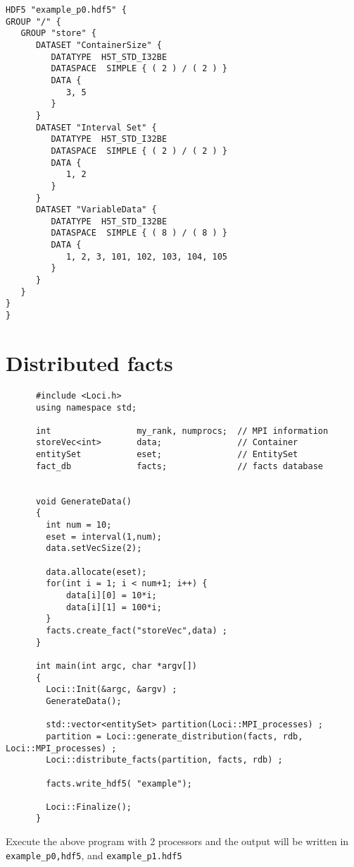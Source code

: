 \begin{verbatim}
HDF5 "example_p0.hdf5" {
GROUP "/" {
   GROUP "store" {
      DATASET "ContainerSize" {
         DATATYPE  H5T_STD_I32BE  
         DATASPACE  SIMPLE { ( 2 ) / ( 2 ) } 
         DATA {
            3, 5
         } 
      } 
      DATASET "Interval Set" {
         DATATYPE  H5T_STD_I32BE  
         DATASPACE  SIMPLE { ( 2 ) / ( 2 ) } 
         DATA {
            1, 2
         } 
      } 
      DATASET "VariableData" {
         DATATYPE  H5T_STD_I32BE  
         DATASPACE  SIMPLE { ( 8 ) / ( 8 ) } 
         DATA {
            1, 2, 3, 101, 102, 103, 104, 105
         } 
      } 
   } 
} 
} 
\end{verbatim}
\section {Distributed facts }
\begin{verbatim} 
      #include <Loci.h>
      using namespace std;
    
      int                 my_rank, numprocs;  // MPI information
      storeVec<int>       data;               // Container
      entitySet           eset;               // EntitySet
      fact_db             facts;              // facts database
    
    
      void GenerateData()
      {
        int num = 10;
        eset = interval(1,num);
        data.setVecSize(2);
    
        data.allocate(eset);
        for(int i = 1; i < num+1; i++) {
            data[i][0] = 10*i;
            data[i][1] = 100*i;
        }
        facts.create_fact("storeVec",data) ;
      }
    
      int main(int argc, char *argv[])
      {
        Loci::Init(&argc, &argv) ;
        GenerateData();
    
        std::vector<entitySet> partition(Loci::MPI_processes) ;
        partition = Loci::generate_distribution(facts, rdb, Loci::MPI_processes) ;
        Loci::distribute_facts(partition, facts, rdb) ;

        facts.write_hdf5( "example");
    
        Loci::Finalize();
      }
\end{verbatim} 
Execute the above program with 2 processors and the output will be written in {\tt example\_p0,hdf5},
and {\tt example\_p1.hdf5}
